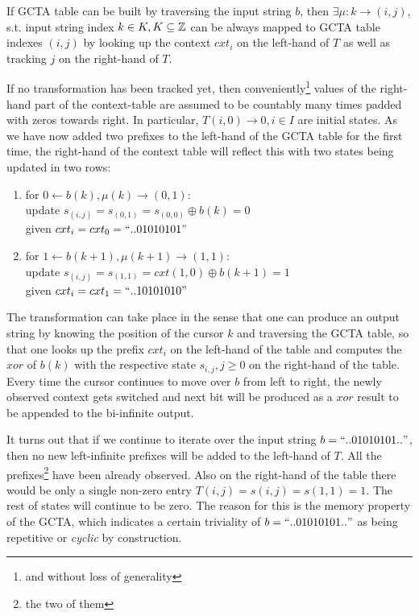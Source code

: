 \begin{lemma}If GCTA table can be built by traversing the input string $b$, then $\exists \mu: k \rightarrow (i,j)$, s.t. input string index $k \in K, K \subseteq \mathbb{Z}$ can be always mapped to GCTA table indexes $(i,j)$ by looking up the context $cxt_i$ on the left-hand of $T$ as well as tracking $j$ on the right-hand of $T$.\end{lemma}

If no transformation has been tracked yet, then conveniently\footnote{and without loss of generality} values of the right-hand part of the context-table are assumed to be countably many times padded with zeros towards right. In particular, $T(i,0) \rightarrow 0, i \in I$ are initial states. As we have now added two prefixes to the left-hand of the GCTA table for the first time, the right-hand of the context table will reflect this with two states being updated in two rows: 

\begin{enumerate}
  \item for $0 \leftarrow b(k), \mu(k) \rightarrow (0,1):$ \\ update $s_{(i,j)} = s_{(0,1)} = s_{(0,0)} \oplus b(k) = 0$ \\ given $cxt_i=cxt_0=\text{``}..01010101\text{''}$
  \item for $1 \leftarrow b(k+1), \mu(k+1) \rightarrow (1,1):$ \\ update $s_{(i,j)} = s_{(1,1)} =cxt{(1,0)} \oplus b(k+1) = 1$ \\ given $cxt_i=cxt_1=\text{``}..10101010\text{''}$
\end{enumerate}

The transformation can take place in the sense that one can produce an output string by knowing the position of the cursor $k$ and traversing the GCTA table, so that one looks up the prefix $cxt_i$ on the left-hand of the table and computes the $xor$ of $b(k)$ with the respective state $s_{i,j}, j \geq 0$ on the right-hand of the table. Every time the cursor continues to move over $b$ from left to right, the newly observed context gets switched and next bit will be produced as a $xor$ result to be appended to the bi-infinite output.

It turns out that if we continue to iterate over the input string $b=\text{``}..01010101..\text{''}$, then no new left-infinite prefixes will be added to the left-hand of $T$. All the prefixes\footnote{the two of them} have been already observed. Also on the right-hand of the table there would be only a single non-zero entry $T(i,j) = s(i,j) = s(1,1) = 1$. The rest of states will continue to be zero. The reason for this is the memory property of the GCTA, which indicates a certain triviality of $b=\text{``}..01010101..\text{''}$ as being repetitive or \textit{cyclic} by construction.

